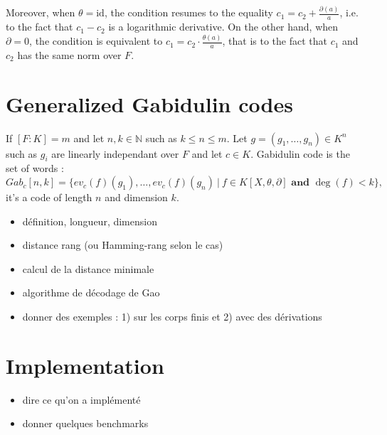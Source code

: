 \documentclass[a4paper]{llncs}
\def\todo#1{{\color{todo} #1}}
\newcommand{\id}{\textrm{id}}
\begin{document}
Moreover, when $\theta = \id$, the condition resumes to the equality 
$c_1 = c_2 + \frac{\partial(a)} a$, i.e. to the fact that $c_1 - c_2$ is 
a logarithmic derivative. On the other hand, when $\partial = 0$, the 
condition is equivalent to $c_1 = c_2 \cdot \frac{\theta(a)}a$, that is 
to the fact that $c_1$ and $c_2$ has the same norm over $F$.



\section{Generalized Gabidulin codes}

\begin{definition}
If $[F:K] = m$ and let $n, k \in \mathbb{N}$ such as $k \leqslant n \leqslant m$. Let $g=(g_1, \dots, g_n) \in K^n$ such as $g_i$ are linearly independant over $F$ and let $c \in K$. Gabidulin code is the set of words : 
$$Gab_c[n,k] =\{ ev_c(f)(g_1), \dots, ev_c(f)(g_n)\ | \ f \in K[X, \theta, \partial] \textbf{ and } \deg(f)<k\},$$
it's a code of length $n$ and dimension $k$.
\end{definition}

\todo{\begin{itemize}
\item définition, longueur, dimension
\item distance rang (ou Hamming-rang selon le cas)
\item calcul de la distance minimale
\item algorithme de décodage de Gao
\item donner des exemples : 1) sur les corps finis et 2) avec des dérivations
\end{itemize}}

\section{Implementation}

\todo{\begin{itemize}
\item dire ce qu'on a implémenté
\item donner quelques benchmarks
\end{itemize}}
\end{document}
